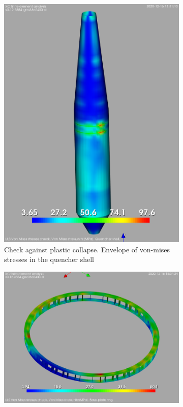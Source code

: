 \documentclass[a4paper,11pt ]{xc_webpage_project}
\begin{document}
\begin{figure}[h]
\begin{subfigure}[b]{0.27\textwidth}
  \includegraphics[width=\textwidth]{figures/vm_quencher_shell}
  \caption{Check against plastic collapse. Envelope of von-mises stresses in the quencher shell}
  \end{subfigure}
\hfill
  \begin{subfigure}[b]{0.30\textwidth}
  \centering
  \includegraphics[width=\textwidth]{figures/vm_baseplate}

\end{subfigure}
\end{figure}
\end{document}
